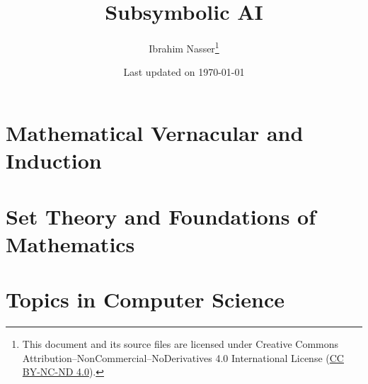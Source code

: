 \documentclass[10pt]{article}
\title{\textbf{Subsymbolic AI}}
\author{Ibrahim Nasser\thanks{This document and its source files are licensed under Creative Commons Attribution--NonCommercial--NoDerivatives 4.0 International License (\href{https://creativecommons.org/licenses/by-nc-nd/4.0/legalcode}{CC BY-NC-ND 4.0}).}}
\date{\small Last updated on \today}
\begin{document}
\maketitle
\tableofcontents

\clearpage
{}
\setcounter{page}{1}
















\clearpage
\appendix
{}
\section{Mathematical Vernacular and Induction}



\newpage
\section{Set Theory and Foundations of Mathematics}





\section{Topics in Computer Science}





\printbibliography
\end{document}
